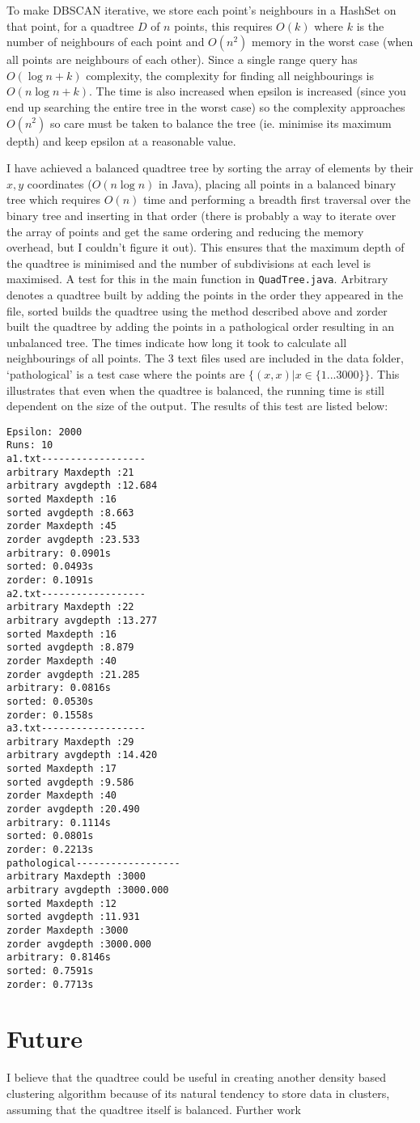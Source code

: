 \documentclass{CRPITStyle}
\begin{document}
To make DBSCAN iterative, we store each point's neighbours in a HashSet on that point, for a quadtree $D$ of $n$ points, this requires $O(k)$ where $k$ is the number of neighbours of each point and $O(n^2)$ memory in the worst case (when all points are neighbours of each other). Since a single range query has $O(\log n + k)$ complexity, the complexity for finding all neighbourings is $O(n \log n + k)$. The time is also increased when epsilon is increased (since you end up searching the entire tree in the worst case) so the complexity approaches $O(n^2)$ so care must be taken to balance the tree (ie. minimise its maximum depth) and keep epsilon at a reasonable value. 

I have achieved a balanced quadtree tree by sorting the array of elements by their $x,y$ coordinates ($O(n \log n)$ in Java), placing all points in a balanced binary tree which requires $O(n)$ time and performing a breadth first traversal over the binary tree and inserting in that order (there is probably a way to iterate over the array of points and get the same ordering and reducing the memory overhead, but I couldn't figure it out). This ensures that the maximum depth of the quadtree is minimised and the number of subdivisions at each level is maximised. A test for this in the main function in \verb+QuadTree.java+. Arbitrary denotes a quadtree built by adding the points in the order they appeared in the file, sorted builds the quadtree using the method described above and zorder built the quadtree by adding the points in a pathological order resulting in an unbalanced tree. The times indicate how long it took to calculate all neighbourings of all points. The 3 text files used are included in the data folder, `pathological' is a test case where the points are $\{(x,x) | x \in \{1...3000\}\}$. This illustrates that even when the quadtree is balanced, the running time is still dependent on the size of the output. The results of this test are listed below:

\begin{verbatim}
Epsilon: 2000
Runs: 10
a1.txt------------------
arbitrary Maxdepth :21
arbitrary avgdepth :12.684
sorted Maxdepth :16
sorted avgdepth :8.663
zorder Maxdepth :45
zorder avgdepth :23.533
arbitrary: 0.0901s 
sorted: 0.0493s 
zorder: 0.1091s 
a2.txt------------------
arbitrary Maxdepth :22
arbitrary avgdepth :13.277
sorted Maxdepth :16
sorted avgdepth :8.879
zorder Maxdepth :40
zorder avgdepth :21.285
arbitrary: 0.0816s 
sorted: 0.0530s 
zorder: 0.1558s 
a3.txt------------------
arbitrary Maxdepth :29
arbitrary avgdepth :14.420
sorted Maxdepth :17
sorted avgdepth :9.586
zorder Maxdepth :40
zorder avgdepth :20.490
arbitrary: 0.1114s 
sorted: 0.0801s 
zorder: 0.2213s 
pathological------------------
arbitrary Maxdepth :3000
arbitrary avgdepth :3000.000
sorted Maxdepth :12
sorted avgdepth :11.931
zorder Maxdepth :3000
zorder avgdepth :3000.000
arbitrary: 0.8146s 
sorted: 0.7591s 
zorder: 0.7713s 
\end{verbatim}

\section{Future}
I believe that the quadtree could be useful in creating another density based clustering algorithm because of its natural tendency to store data in clusters, assuming that the quadtree itself is balanced. Further work


  

\end{document}
